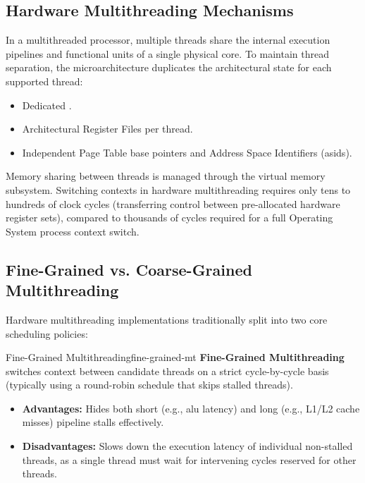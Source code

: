 \subsection{Hardware Multithreading Mechanisms}

In a multithreaded processor, multiple threads share the internal execution pipelines and functional units of a single physical core. To maintain thread separation, the microarchitecture duplicates the architectural state for each supported thread:
\begin{itemize}
    \item Dedicated .
    \item Architectural Register Files per thread.
    \item Independent Page Table base pointers and Address Space Identifiers (\glspl{asid}).
\end{itemize}

Memory sharing between threads is managed through the virtual memory subsystem. Switching contexts in hardware multithreading requires only tens to hundreds of clock cycles (transferring control between pre-allocated hardware register sets), compared to thousands of cycles required for a full Operating System process context switch.

\subsection{Fine-Grained vs. Coarse-Grained Multithreading}

Hardware multithreading implementations traditionally split into two core scheduling policies:

\begin{definition}{Fine-Grained Multithreading}{fine-grained-mt}
    \textbf{Fine-Grained Multithreading} switches context between candidate threads on a strict cycle-by-cycle basis (typically using a round-robin schedule that skips stalled threads).
    \begin{itemize}
        \item \textbf{Advantages:} Hides both short (e.g., \gls{alu} latency) and long (e.g., L1/L2 cache misses) pipeline stalls effectively.
        \item \textbf{Disadvantages:} Slows down the execution latency of individual non-stalled threads, as a single thread must wait for intervening cycles reserved for other threads.
    \end{itemize}
\end{definition}

